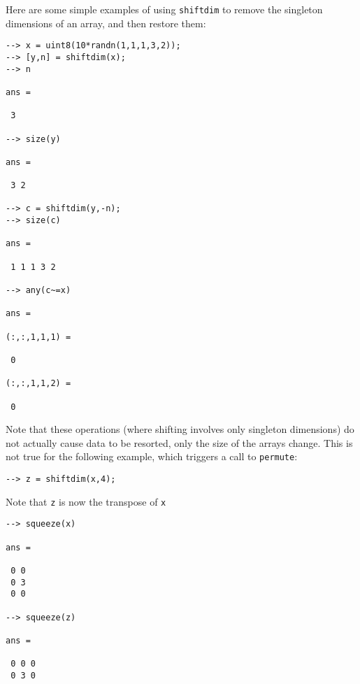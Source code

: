 Here are some simple examples of using \verb|shiftdim| to remove the singleton
dimensions of an array, and then restore them:
\begin{verbatim}
--> x = uint8(10*randn(1,1,1,3,2));
--> [y,n] = shiftdim(x);
--> n

ans = 

 3 

--> size(y)

ans = 

 3 2 

--> c = shiftdim(y,-n);
--> size(c)

ans = 

 1 1 1 3 2 

--> any(c~=x)

ans = 

(:,:,1,1,1) = 

 0 

(:,:,1,1,2) = 

 0 
\end{verbatim}
Note that these operations (where shifting involves only singleton dimensions)
do not actually cause data to be resorted, only the size of the arrays change.
This is not true for the following example, which triggers a call to \verb|permute|:
\begin{verbatim}
--> z = shiftdim(x,4);
\end{verbatim}
 Note that \verb|z| is now the transpose of \verb|x|
\begin{verbatim}
--> squeeze(x)

ans = 

 0 0 
 0 3 
 0 0 

--> squeeze(z)

ans = 

 0 0 0 
 0 3 0 
\end{verbatim}
